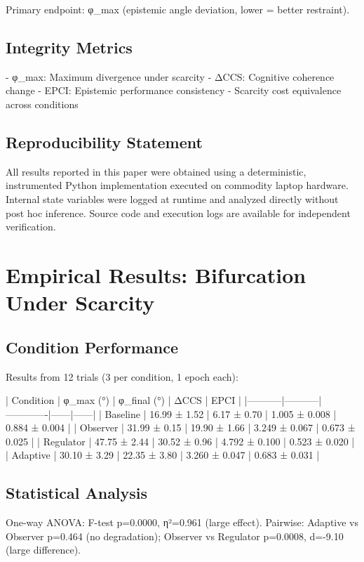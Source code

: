 \documentclass[12pt,a4paper]{report}
\begin{document}
Primary endpoint: φ_max (epistemic angle deviation, lower = better restraint).

\subsection{Integrity Metrics}

- φ_max: Maximum divergence under scarcity
- ΔCCS: Cognitive coherence change
- EPCI: Epistemic performance consistency
- Scarcity cost equivalence across conditions

\subsection{Reproducibility Statement}

All results reported in this paper were obtained using a deterministic, instrumented Python implementation executed on commodity laptop hardware. Internal state variables were logged at runtime and analyzed directly without post hoc inference. Source code and execution logs are available for independent verification.

\section{Empirical Results: Bifurcation Under Scarcity}

\subsection{Condition Performance}

Results from 12 trials (3 per condition, 1 epoch each):

| Condition | φ_max (°) | φ_final (°) | ΔCCS | EPCI |
|-----------|-----------|-------------|------|------|
| Baseline | 16.99 ± 1.52 | 6.17 ± 0.70 | 1.005 ± 0.008 | 0.884 ± 0.004 |
| Observer | 31.99 ± 0.15 | 19.90 ± 1.66 | 3.249 ± 0.067 | 0.673 ± 0.025 |
| Regulator | 47.75 ± 2.44 | 30.52 ± 0.96 | 4.792 ± 0.100 | 0.523 ± 0.020 |
| Adaptive | 30.10 ± 3.29 | 22.35 ± 3.80 | 3.260 ± 0.047 | 0.683 ± 0.031 |

\subsection{Statistical Analysis}

One-way ANOVA: F-test p=0.0000, η²=0.961 (large effect).
Pairwise: Adaptive vs Observer p=0.464 (no degradation); Observer vs Regulator p=0.0008, d=-9.10 (large difference).
\end{document}
